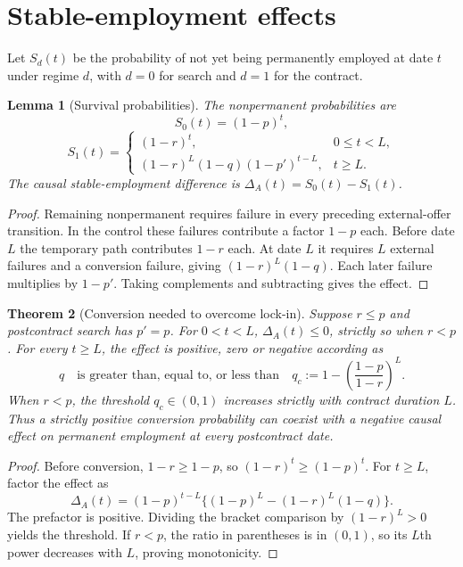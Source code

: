 \documentclass[11pt,a4paper]{article}
\newtheorem{theorem}{Theorem}[section]
\newtheorem{lemma}[theorem]{Lemma}
\theoremstyle{definition}
\theoremstyle{remark}
\begin{document}
\section{Stable-employment effects}
Let $S_d(t)$ be the probability of not yet being permanently employed at date $t$ under regime $d$, with $d=0$ for search and $d=1$ for the contract.

\begin{lemma}[Survival probabilities]\label{le:survival}
The nonpermanent probabilities are
\[
 S_0(t)=(1-p)^t,
\]
\[
 S_1(t)=\begin{cases}
 (1-r)^t,&0\leq t<L,\\
 (1-r)^L(1-q)(1-p')^{t-L},&t\geq L.
 \end{cases}
\]
The causal stable-employment difference is $\Delta_A(t)=S_0(t)-S_1(t)$.
\end{lemma}
\begin{proof}
Remaining nonpermanent requires failure in every preceding external-offer transition. In the control these failures contribute a factor $1-p$ each. Before date $L$ the temporary path contributes $1-r$ each. At date $L$ it requires $L$ external failures and a conversion failure, giving $(1-r)^L(1-q)$. Each later failure multiplies by $1-p'$. Taking complements and subtracting gives the effect.
\end{proof}

\begin{theorem}[Conversion needed to overcome lock-in]\label{th:conversion}
Suppose $r\leq p$ and postcontract search has $p'=p$. For $0<t<L$, $\Delta_A(t)\leq0$, strictly so when $r<p$. For every $t\geq L$, the effect is positive, zero or negative according as
\[
 q\quad\text{is greater than, equal to, or less than}\quad
 q_c:=1-\left(\frac{1-p}{1-r}\right)^L.
\]
When $r<p$, the threshold $q_c\in(0,1)$ increases strictly with contract duration $L$. Thus a strictly positive conversion probability can coexist with a negative causal effect on permanent employment at every postcontract date.
\end{theorem}
\begin{proof}
Before conversion, $1-r\geq1-p$, so $(1-r)^t\geq(1-p)^t$. For $t\geq L$, factor the effect as
\[
 \Delta_A(t)=(1-p)^{t-L}
 \{(1-p)^L-(1-r)^L(1-q)\}.
\]
The prefactor is positive. Dividing the bracket comparison by $(1-r)^L>0$ yields the threshold. If $r<p$, the ratio in parentheses is in $(0,1)$, so its $L$th power decreases with $L$, proving monotonicity.
\end{proof}
\end{document}
